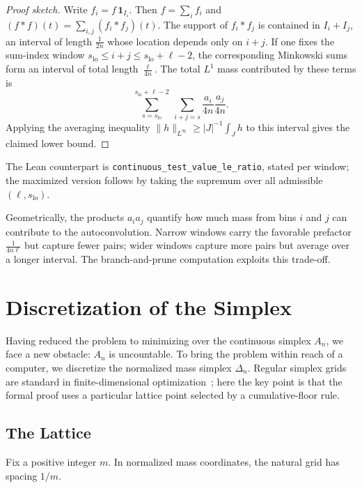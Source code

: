 \documentclass[11pt, letterpaper]{article}
\theoremstyle{paperplain}
\theoremstyle{paperdef}
\begin{document}
\begin{proof}[Proof sketch]
Write $f_i=f\,\mathbf{1}_{I_i}$.  Then
$f=\sum_i f_i$ and $(f*f)(t)=\sum_{i,j}(f_i*f_j)(t)$.  The support of
$f_i*f_j$ is contained in $I_i+I_j$, an interval of length
$\tfrac{1}{2n}$ whose location depends only on $i+j$.  If one fixes
the sum-index window
$s_{\mathrm{lo}}\le i+j\le s_{\mathrm{lo}}+\ell-2$, the corresponding
Minkowski sums form an interval of total length $\tfrac{\ell}{4n}$.
The total $L^1$ mass contributed by these terms is
\[
  \sum_{s=s_{\mathrm{lo}}}^{s_{\mathrm{lo}}+\ell-2}
  \ \sum_{i+j=s}
  \frac{a_i}{4n}\frac{a_j}{4n}.
\]
Applying the averaging inequality
$\|h\|_{L^\infty}\ge |J|^{-1}\int_J h$ to this interval gives the
claimed lower bound.
\end{proof}

The Lean counterpart is
\texttt{continuous\_test\_value\_le\_ratio}, stated per window;
the maximized version follows by taking the supremum over all admissible
$(\ell,s_{\mathrm{lo}})$.

Geometrically, the products $a_i a_j$ quantify how much mass from
bins $i$ and $j$ can contribute to the autoconvolution.  Narrow windows
carry the favorable prefactor $\tfrac{1}{4n\ell}$ but capture fewer
pairs; wider windows capture more pairs but average over a longer
interval.  The branch-and-prune computation exploits this trade-off.


\section{Discretization of the Simplex}\label{sec:disc}

Having reduced the problem to minimizing over the continuous simplex
$A_n$, we face a new obstacle: $A_n$ is uncountable.  To bring the
problem within reach of a computer, we discretize the normalized mass
simplex $\Delta_n$.  Regular simplex grids are standard in
finite-dimensional optimization~\cite{Bomze2014}; here the key point is
that the formal proof uses a particular lattice point selected by a
cumulative-floor rule.

\subsection{The Lattice}

Fix a positive integer $m$.  In normalized mass coordinates, the
natural grid has spacing $1/m$.
\end{document}
